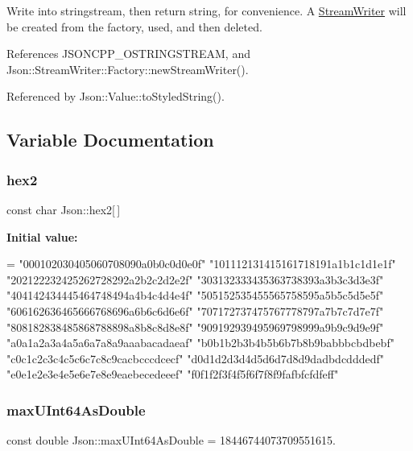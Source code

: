 Write into stringstream, then return string, for convenience. A \hyperlink{classJson_1_1StreamWriter}{Stream\+Writer} will be created from the factory, used, and then deleted. 



References J\+S\+O\+N\+C\+P\+P\+\_\+\+O\+S\+T\+R\+I\+N\+G\+S\+T\+R\+E\+AM, and Json\+::\+Stream\+Writer\+::\+Factory\+::new\+Stream\+Writer().



Referenced by Json\+::\+Value\+::to\+Styled\+String().



\subsection{Variable Documentation}
\mbox{\label{namespaceJson_a05aed54518637ec00aac59b03eb855a1_a05aed54518637ec00aac59b03eb855a1}} 
\subsubsection{\texorpdfstring{hex2}{hex2}}
{\footnotesize\ttfamily const char Json\+::hex2\mbox{[}$\,$\mbox{]}\hspace{0.3cm}{\ttfamily [static]}}

{\bfseries Initial value\+:}
\begin{DoxyCode}
=
  \textcolor{stringliteral}{"000102030405060708090a0b0c0d0e0f"}
  \textcolor{stringliteral}{"101112131415161718191a1b1c1d1e1f"}
  \textcolor{stringliteral}{"202122232425262728292a2b2c2d2e2f"}
  \textcolor{stringliteral}{"303132333435363738393a3b3c3d3e3f"}
  \textcolor{stringliteral}{"404142434445464748494a4b4c4d4e4f"}
  \textcolor{stringliteral}{"505152535455565758595a5b5c5d5e5f"}
  \textcolor{stringliteral}{"606162636465666768696a6b6c6d6e6f"}
  \textcolor{stringliteral}{"707172737475767778797a7b7c7d7e7f"}
  \textcolor{stringliteral}{"808182838485868788898a8b8c8d8e8f"}
  \textcolor{stringliteral}{"909192939495969798999a9b9c9d9e9f"}
  \textcolor{stringliteral}{"a0a1a2a3a4a5a6a7a8a9aaabacadaeaf"}
  \textcolor{stringliteral}{"b0b1b2b3b4b5b6b7b8b9babbbcbdbebf"}
  \textcolor{stringliteral}{"c0c1c2c3c4c5c6c7c8c9cacbcccdcecf"}
  \textcolor{stringliteral}{"d0d1d2d3d4d5d6d7d8d9dadbdcdddedf"}
  \textcolor{stringliteral}{"e0e1e2e3e4e5e6e7e8e9eaebecedeeef"}
  \textcolor{stringliteral}{"f0f1f2f3f4f5f6f7f8f9fafbfcfdfeff"}
\end{DoxyCode}
\mbox{\label{namespaceJson_aecc0306aa526f25c5156f842182fb7fb_aecc0306aa526f25c5156f842182fb7fb}} 
\subsubsection{\texorpdfstring{max\+U\+Int64\+As\+Double}{maxUInt64AsDouble}}
{\footnotesize\ttfamily const double Json\+::max\+U\+Int64\+As\+Double = 18446744073709551615.\hspace{0.3cm}{\ttfamily [static]}}

